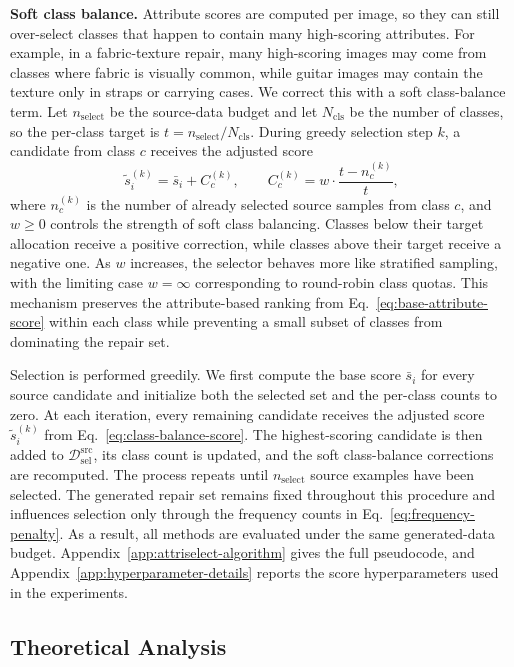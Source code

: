 \documentclass{article}
\newcommand{\dataset}{\mathcal{D}}
\begin{document}
\noindent\textbf{Soft class balance.} Attribute scores are computed per image, so they can still over-select classes that happen to contain many high-scoring attributes. For example, in a fabric-texture repair, many high-scoring images may come from classes where fabric is visually common, while guitar images may contain the texture only in straps or carrying cases. We correct this with a soft class-balance term. Let $n_{\text{select}}$ be the source-data budget and let $N_{\text{cls}}$ be the number of classes, so the per-class target is $t = n_{\text{select}} / N_{\text{cls}}$. During greedy selection step $k$, a candidate from class $c$ receives the adjusted score
\begin{equation}
\label{eq:class-balance-score}
\tilde{s}_i^{(k)} = \bar{s}_i + C_c^{(k)}, \qquad
C_c^{(k)} = w \cdot \frac{t - n_c^{(k)}}{t},
\end{equation}
where $n_c^{(k)}$ is the number of already selected source samples from class $c$, and $w \geq 0$ controls the strength of soft class balancing. Classes below their target allocation receive a positive correction, while classes above their target receive a negative one. As $w$ increases, the selector behaves more like stratified sampling, with the limiting case $w=\infty$ corresponding to round-robin class quotas. This mechanism preserves the attribute-based ranking from Eq.~\ref{eq:base-attribute-score} within each class while preventing a small subset of classes from dominating the repair set.

Selection is performed greedily. We first compute the base score $\bar{s}_i$ for every source candidate and initialize both the selected set and the per-class counts to zero. At each iteration, every remaining candidate receives the adjusted score $\tilde{s}_i^{(k)}$ from Eq.~\ref{eq:class-balance-score}. The highest-scoring candidate is then added to $\dataset_{\mathrm{sel}}^{\mathrm{src}}$, its class count is updated, and the soft class-balance corrections are recomputed. The process repeats until $n_{\text{select}}$ source examples have been selected. The generated repair set remains fixed throughout this procedure and influences selection only through the frequency counts in Eq.~\ref{eq:frequency-penalty}. As a result, all methods are evaluated under the same generated-data budget. Appendix~\ref{app:attriselect-algorithm} gives the full pseudocode, and Appendix~\ref{app:hyperparameter-details} reports the score hyperparameters used in the experiments.

\subsection{Theoretical Analysis}
\label{subsec:slice-enrichment}
\end{document}
